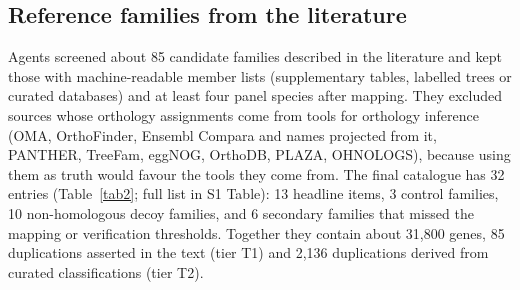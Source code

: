 \subsection*{Reference families from the literature}
Agents screened about 85 candidate families described in the literature and kept those with machine-readable member
lists (supplementary tables, labelled trees or curated databases) and at least four panel species after mapping. They
excluded sources whose orthology assignments come from tools for orthology inference (OMA, OrthoFinder, Ensembl Compara and
names projected from it, PANTHER, TreeFam, eggNOG, OrthoDB, PLAZA, OHNOLOGS), because using them as truth would favour
the tools they come from. The final catalogue has 32 entries (Table~\ref{tab2}; full list in S1 Table): 13 headline
items, 3 control families, 10 non-homologous decoy families, and 6 secondary families that missed the mapping or
verification thresholds. Together they contain about 31,800 genes, 85 duplications asserted in the text (tier T1) and
2,136 duplications derived from curated classifications (tier T2).

